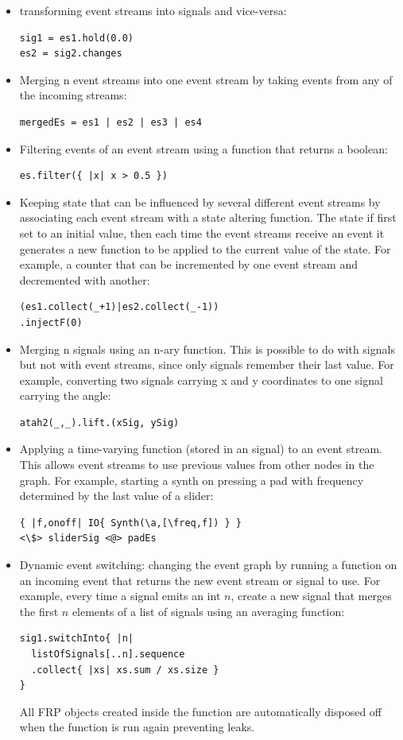\documentclass{article}
\begin{document}
\begin{itemize}

\item transforming event streams into signals and vice-versa:
\begin{Verbatim}
sig1 = es1.hold(0.0)
es2 = sig2.changes
\end{Verbatim}
\item Merging n event streams into one event stream by taking events from any of the incoming streams:
\begin{Verbatim}
mergedEs = es1 | es2 | es3 | es4
\end{Verbatim}
\item Filtering events of an event stream using a function that returns a boolean:
\begin{Verbatim}
es.filter({ |x| x > 0.5 })
\end{Verbatim}
\item Keeping state that can be influenced by several different event streams by  associating each event stream with a state altering function. The state if first set to an initial value, then each time the event streams receive an event it generates a new function to be applied to the current value of the state. For example, a counter that can be incremented by one event stream and decremented with another:
\begin{Verbatim}
(es1.collect(_+1)|es2.collect(_-1))
.injectF(0) 
\end{Verbatim}
\item Merging n signals using an n-ary function. This is possible to do with signals but not with event streams, since only signals remember their last value. For example, converting two signals carrying x and y coordinates to one signal carrying the angle: 
\begin{Verbatim}
atah2(_,_).lift.(xSig, ySig)
\end{Verbatim}
\item Applying a time-varying function (stored in an signal) to an event stream. This allows event streams to use previous values from other nodes in the graph. For example, starting a synth on pressing a pad with frequency determined by the last value of a slider:
\begin{Verbatim}
{ |f,onoff| IO{ Synth(\a,[\freq,f]) } }
<\$> sliderSig <@> padEs 
\end{Verbatim}
\item Dynamic event switching: changing the event graph by running a function on an incoming event that returns the new event stream or signal to use. For example, every time a signal emits an int $n$, create a new signal that merges the first $n$ elements of a list of signals using an averaging function: 
\begin{Verbatim}
sig1.switchInto{ |n|
  listOfSignals[..n].sequence
  .collect{ |xs| xs.sum / xs.size }
}
\end{Verbatim}
All FRP objects created inside the function are automatically disposed off when the function is run again preventing leaks.
\end{itemize}
\end{document}
